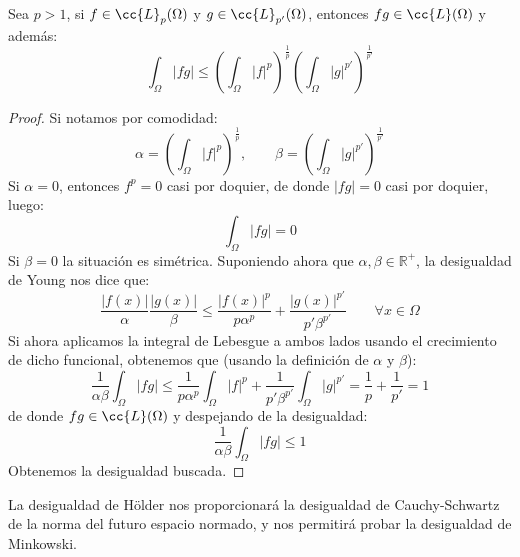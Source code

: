 \begin{teo}
    Sea $p>1$, si $f\in \cc{L}_p(\Omega)$ y $g\in \cc{L}_{p'}(\Omega)$, entonces $fg\in \cc{L}(\Omega)$ y además:
    \begin{equation*}
        \int_\Omega |fg| \leq {\left(\int_\Omega |f|^p\right)}^{\frac{1}{p}}{\left(\int_\Omega |g|^{p'}\right)}^{\frac{1}{p'}}
    \end{equation*}
    \begin{proof}
        Si notamos por comodidad:
        \begin{equation*}
            \alpha = {\left(\int_\Omega |f|^p\right)}^{\frac{1}{p}},  \qquad \beta ={\left(\int_\Omega |g|^{p'}\right)}^{\frac{1}{p'}}
        \end{equation*}
        Si $\alpha = 0$, entonces $f^p = 0$ casi por doquier, de donde $|fg| = 0$ casi por doquier, luego:
        \begin{equation*}
            \int_\Omega|fg| = 0
        \end{equation*}
        Si $\beta = 0$ la situación es simétrica. Suponiendo ahora que $\alpha,\beta\in \mathbb{R}^+$, la desigualdad de Young nos dice que:
        \begin{equation*}
            \dfrac{|f(x)|}{\alpha} \dfrac{|g(x)|}{\beta}\leq \dfrac{|f(x)|^p}{p\alpha^p} + \dfrac{|g(x)|^{p'}}{p' \beta^{p'}} \qquad \forall x\in \Omega
        \end{equation*}
        Si ahora aplicamos la integral de Lebesgue a ambos lados usando el crecimiento de dicho funcional, obtenemos que (usando la definición de $\alpha$ y $\beta$):
        \begin{equation*}
            \dfrac{1}{\alpha\beta} \int_\Omega |fg| \leq \dfrac{1}{p\alpha^p} \int_\Omega |f|^p + \dfrac{1}{p'\beta^{p'}} \int_\Omega |g|^{p'} = \dfrac{1}{p} + \dfrac{1}{p'} = 1
        \end{equation*}
        de donde $fg\in \cc{L}(\Omega)$ y despejando de la desigualdad:
        \begin{equation*}
            \dfrac{1}{\alpha\beta} \int_\Omega |fg| \leq 1
        \end{equation*}
        Obtenemos la desigualdad buscada.
    \end{proof}
\end{teo}

\noindent
La desigualdad de Hölder nos proporcionará la desigualdad de Cauchy-Schwartz de la norma del futuro espacio normado, y nos permitirá probar la desigualdad de Minkowski.

